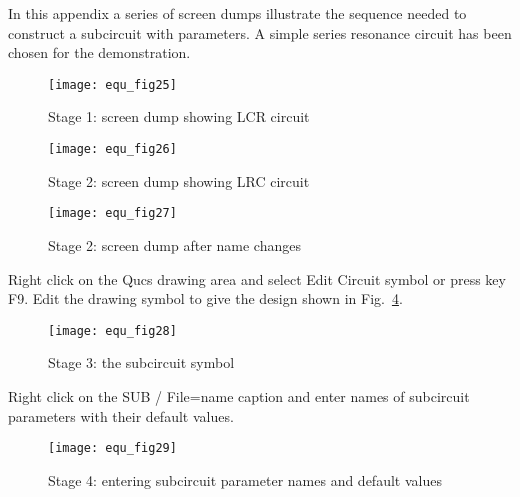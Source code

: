 In this appendix a series of screen dumps illustrate the sequence
needed to construct a subcircuit with parameters.  A simple series
resonance circuit has been chosen for the demonstration.


\begin{figure}[h]
  \centering
  \texttt{[image: equ\_fig25]}
  \caption{Stage 1: screen dump showing LCR circuit} 
  \label{fig:equ_25}
\end{figure} 
\FloatBarrier

\newpage 


\begin{figure}[h]
  \centering
  \texttt{[image: equ\_fig26]}
  \caption{Stage 2: screen dump showing LRC circuit} 
  \label{fig:equ_26}
\end{figure} 

\begin{figure}[h]
  \centering
  \texttt{[image: equ\_fig27]}
  \caption{Stage 2: screen dump after name changes} 
  \label{fig:equ_27}
\end{figure} 
\FloatBarrier

\newpage 


Right click on the Qucs drawing area and select Edit Circuit symbol or
press key F9. Edit the drawing symbol to give the design shown in
Fig.~\ref{fig:equ_28}.

\begin{figure}[h] 
  \centering
  \texttt{[image: equ\_fig28]}
  \caption{Stage 3: the subcircuit symbol} 
  \label{fig:equ_28}
\end{figure} 
\FloatBarrier

\newpage 


Right click on the SUB / File=name caption and enter names of
subcircuit parameters with their default values.

\begin{figure}[h]
  \centering
  \texttt{[image: equ\_fig29]}
  \caption{Stage 4: entering subcircuit parameter names and default values} 
  \label{fig:equ_29}
\end{figure} 

